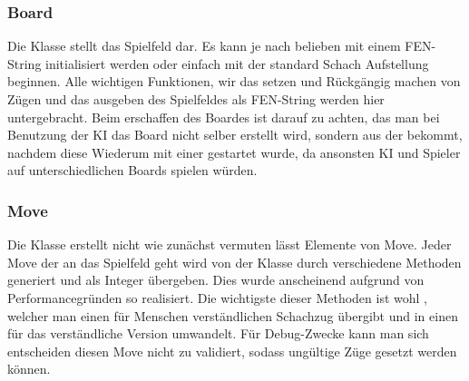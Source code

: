 \subsubsection{Board}

Die Klasse  stellt das Spielfeld dar. Es kann je nach belieben mit 
einem FEN-String initialisiert werden oder einfach mit der standard Schach 
Aufstellung beginnen. Alle wichtigen Funktionen, wir das setzen und Rückgängig 
machen von Zügen und das ausgeben des Spielfeldes als FEN-String werden hier 
untergebracht. Beim erschaffen des Boardes ist darauf zu achten, das man bei 
Benutzung der KI das Board nicht selber erstellt wird, sondern aus der 
 bekommt, nachdem diese Wiederum mit einer  
gestartet wurde, da ansonsten KI und Spieler auf unterschiedlichen Boards 
spielen würden.

\subsubsection{Move}

Die Klasse  erstellt nicht wie zunächst vermuten lässt Elemente von 
Move. Jeder Move der an das Spielfeld geht wird von der Klasse  durch 
verschiedene Methoden generiert und als Integer übergeben. Dies wurde 
anscheinend aufgrund von Performancegründen so realisiert. Die wichtigste dieser 
Methoden ist wohl , welcher man einen für Menschen 
verständlichen Schachzug übergibt und in einen für das  
verständliche Version umwandelt. Für Debug-Zwecke kann man sich entscheiden 
diesen Move nicht zu validiert, sodass ungültige Züge gesetzt werden können.